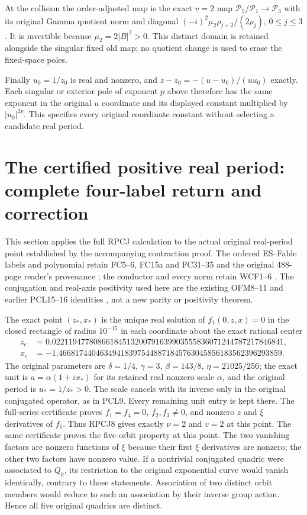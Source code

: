 \documentclass[11pt]{article}
\begin{document}
At the collision the order-adjusted map is the exact $v=2$ map
$\mathcal P_5/\mathcal P_1\to\mathcal P_3$ with its original
Gamma quotient norm and diagonal
$(-i)^2\mu_2\rho_{j+2}/(2\rho_j)$, $0\le j\le3$.
It is invertible because $\mu_2=2|B|^2>0$.
This distinct domain is retained alongside the singular fixed old
map; no quotient change is used to erase the fixed-space poles.

Finally $u_0=1/z_0$ is real and nonzero, and
$z-z_0=-(u-u_0)/(uu_0)$ exactly.
Each singular or exterior pole of exponent $p$ above therefore has
the same exponent in the original $u$ coordinate and its displayed
constant multiplied by $|u_0|^{2p}$. This specifies every original
coordinate constant without selecting a candidate real period.

\section{The certified positive real period: complete four-label return and correction}
This section applies the full RPCJ calculation to the actual original
real-period point established by the accompanying contraction proof.
The ordered ES--Fable labels and polynomial retain FC5--6, FC15a and
FC31--35 and the original 488-page reader's provenance
\cite{ES488,Cumulative}; the conductor and every norm retain WCF1--6
\cite{WCF}. The conjugation and real-axis positivity used here are
the existing OFM8--11 and earlier PCL15--16 identities
\cite{PCLOriginal,Cumulative}, not a new parity or positivity theorem.

The exact point $(z_*,x_*)$ is the unique real solution of
$f_1(0,z,x)=0$ in the closed rectangle of radius $10^{-15}$ in
each coordinate about the exact rational center
\[
 \begin{split}
 z_c&=0.02211947780866184513200791639903555836071244787217846841,\\
 x_c&=-1.466817440463494183975448871845763045856183562396293859.
 \end{split}\tag{RPE1}
\]
The original parameters are
$\delta=1/4$, $\gamma=3$, $\beta=143/8$, $\eta=21025/256$;
the exact unit is $a=\alpha(1+ix_*)$ for its retained real nonzero
scale $\alpha$, and the original period is $u_*=1/z_*>0$.
The scale cancels with its inverse only in the original conjugated
operator, as in PCL9. Every remaining unit entry is kept there.
The full-series certificate proves $f_1=f_4=0$,
$f_2,f_3\ne0$, and nonzero $z$ and $\xi$ derivatives of $f_1$.
Thus RPCJ8 gives exactly $\nu=2$ and $v=2$ at this point.
The same certificate proves the five-orbit property at this point.
The two vanishing factors are nonzero functions of $\xi$ because
their first $\xi$ derivatives are nonzero; the other two factors
have nonzero value. If a nontrivial conjugated quadric were associated
to $Q_0$, its restriction to the original exponential curve would
vanish identically, contrary to those statements. Association of two
distinct orbit members would reduce to such an association by their
inverse group action. Hence all five original quadrics are distinct.
\end{document}
